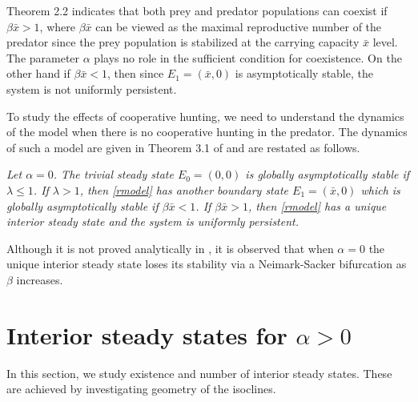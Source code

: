 \documentclass[11pt]{article}
\begin{document}
Theorem 2.2 indicates that both prey and predator populations can
coexist if $\beta \bar x>1$, where $\beta  \bar x$ can be viewed
as the maximal reproductive number of the predator since the prey
population is stabilized at the carrying capacity $\bar x$ level.
The parameter $\alpha$ plays no role in the sufficient condition
for coexistence. On the other hand if $\beta \bar x<1$, then since
$E_1=(\bar x, 0)$ is asymptotically stable, the system is not
uniformly persistent.



To study the effects of cooperative hunting, we need to understand
the dynamics of the model when there is no cooperative hunting in
the predator. The dynamics of such a  model are given in Theorem
3.1 of \cite{jang2006} and are restated as follows.

\medskip

 {\em Let $\alpha=0$. The trivial
steady state $E_0=(0,0)$ is globally asymptotically stable if
$\lambda\leq 1$. If $\lambda>1$, then \eqref{rmodel} has another
boundary state $E_1=(\bar x,0)$ which is globally asymptotically
stable if $\beta \bar x <1$.  If $\beta \bar x >1$, then
\eqref{rmodel} has a unique interior steady state and the system
is uniformly persistent.}

\medskip

 Although
it is not proved analytically in \cite{jang2006}, it is observed
that when $\alpha=0$ the unique interior steady state loses its
stability via a Neimark-Sacker bifurcation as $\beta$ increases.




\section{Interior steady states for $\alpha>0$}
\setcounter{equation}{0}

In this section, we study existence and  number of  interior
steady states. These are achieved by investigating geometry of the
isoclines.
\end{document}

